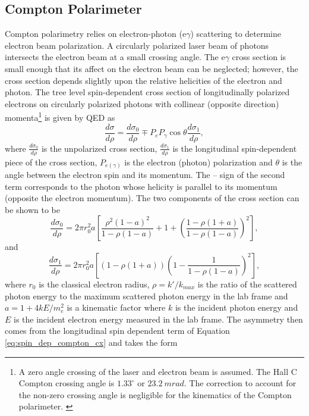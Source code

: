 \subsection{\label{sctn:compton}Compton Polarimeter} 
Compton polarimetry relies on electron-photon (e$\gamma$) scattering to determine electron beam polarization. A circularly polarized laser beam of photons intersects the electron beam at a small crossing angle. The e$\gamma$ cross section is small enough that its affect on the electron beam can be neglected; however, the cross section depends slightly upon the relative helicities of the electron and photon. The tree level spin-dependent cross section of longitudinally polarized electrons on circularly polarized photons with collinear (opposite direction) momenta\footnote{A zero angle crossing of the laser and electron beam is assumed. The Hall C Compton crossing angle is $1.33^{\circ}$ or $23.2~mrad$. The correction to account for the non-zero crossing angle is negligible for the kinematics of the Compton polarimeter. \cite{Denner1999}} is given by QED as \cite{Prescott1973}\cite{Tolhoek1956}
\begin{equation}
\frac{d\sigma}{d\rho}=\frac{d\sigma_0}{d\rho} \mp P_eP_{\gamma}\cos\theta\frac{d\sigma_1}{d\rho},
\label{eq:compton_cx}
\end{equation}
where $\frac{d\sigma_0}{d\rho}$ is the unpolarized cross section, $\frac{d\sigma_1}{d\rho}$ is the longitudinal spin-dependent piece of the cross section, $P_{e(\gamma)}$ is the electron (photon) polarization and $\theta$ is the angle between the electron spin and its momentum. The -- sign of the second term corresponds to the photon whose helicity is parallel to its momentum (opposite the electron momentum)\cite{Prescott1973}. The two components of the cross section can be shown to be
\begin{equation}
\frac{d\sigma_0}{d\rho}=2\pi r_0^2a\left[\frac{\rho^2(1-a)^2}{1-\rho(1-a)}+1+\left(\frac{1-\rho(1+a)}{1-\rho(1-a)}\right)^2\right],
\label{eq:unpol_compton_cx}
\end{equation}
and 
\begin{equation}
\frac{d\sigma_1}{d\rho}=2\pi r_0^2a\left[\left(1-\rho (1+a)\right)\left(1-\frac{1}{1-\rho(1-a)}\right)^2\right],
\label{eq:spin_dep_compton_cx}
\end{equation}
where $r_0$ is the classical electron radius, $\rho=k'/k_{max}$ is the ratio of the scattered photon energy to the maximum scattered photon energy in the lab frame and $a=1+4kE/m_e^2$ is a kinematic factor where $k$ is the incident photon energy and $E$ is the incident electron energy measured in the lab frame. The asymmetry then comes from the longitudinal spin dependent term of Equation \ref{eq:spin_dep_compton_cx} and takes the form
